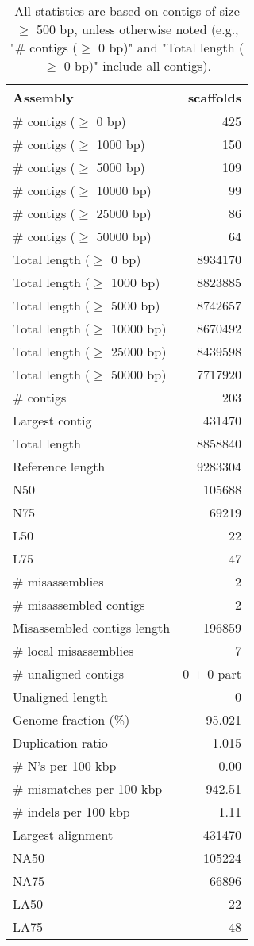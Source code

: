 \documentclass[12pt,a4paper]{article}
\begin{document}
\begin{table}[ht]
\begin{center}
\caption{All statistics are based on contigs of size $\geq$ 500 bp, unless otherwise noted (e.g., "\# contigs ($\geq$ 0 bp)" and "Total length ($\geq$ 0 bp)" include all contigs).}
\begin{tabular}{|l*{1}{|r}|}
\hline
Assembly & scaffolds \\ \hline
\# contigs ($\geq$ 0 bp) & 425 \\ \hline
\# contigs ($\geq$ 1000 bp) & 150 \\ \hline
\# contigs ($\geq$ 5000 bp) & 109 \\ \hline
\# contigs ($\geq$ 10000 bp) & 99 \\ \hline
\# contigs ($\geq$ 25000 bp) & 86 \\ \hline
\# contigs ($\geq$ 50000 bp) & 64 \\ \hline
Total length ($\geq$ 0 bp) & 8934170 \\ \hline
Total length ($\geq$ 1000 bp) & 8823885 \\ \hline
Total length ($\geq$ 5000 bp) & 8742657 \\ \hline
Total length ($\geq$ 10000 bp) & 8670492 \\ \hline
Total length ($\geq$ 25000 bp) & 8439598 \\ \hline
Total length ($\geq$ 50000 bp) & 7717920 \\ \hline
\# contigs & 203 \\ \hline
Largest contig & 431470 \\ \hline
Total length & 8858840 \\ \hline
Reference length & 9283304 \\ \hline
N50 & 105688 \\ \hline
N75 & 69219 \\ \hline
L50 & 22 \\ \hline
L75 & 47 \\ \hline
\# misassemblies & 2 \\ \hline
\# misassembled contigs & 2 \\ \hline
Misassembled contigs length & 196859 \\ \hline
\# local misassemblies & 7 \\ \hline
\# unaligned contigs & 0 + 0 part \\ \hline
Unaligned length & 0 \\ \hline
Genome fraction (\%) & 95.021 \\ \hline
Duplication ratio & 1.015 \\ \hline
\# N's per 100 kbp & 0.00 \\ \hline
\# mismatches per 100 kbp & 942.51 \\ \hline
\# indels per 100 kbp & 1.11 \\ \hline
Largest alignment & 431470 \\ \hline
NA50 & 105224 \\ \hline
NA75 & 66896 \\ \hline
LA50 & 22 \\ \hline
LA75 & 48 \\ \hline
\end{tabular}
\end{center}
\end{table}
\end{document}
